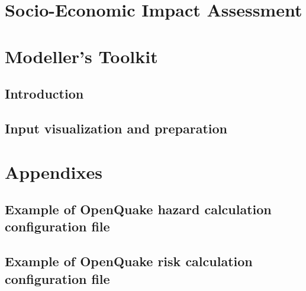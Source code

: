 \documentclass[12pt,a4paper,smallheadings]{scrbook}
\begin{document}
\part{Socio-Economic Impact Assessment}
	
\part{Modeller's Toolkit}
\chapter{Introduction}
	
\chapter{Input visualization and preparation}
	
\part{Appendixes}
\appendix
\chapter{Example of OpenQuake hazard calculation configuration file}
	
\chapter{Example of OpenQuake risk calculation configuration file}


\end{document}
